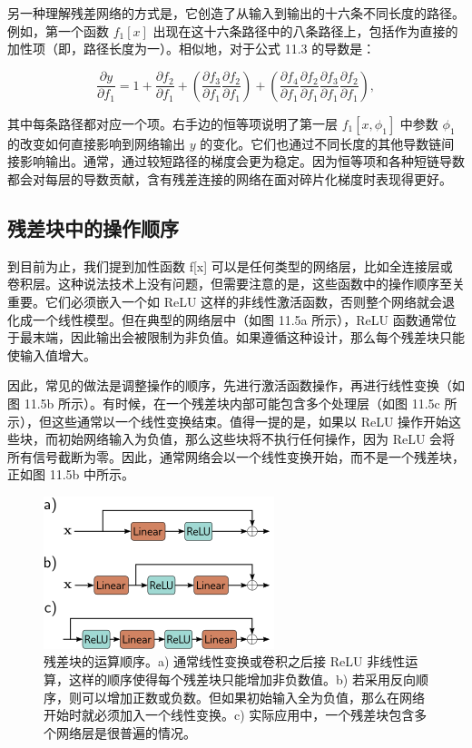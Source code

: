 另一种理解残差网络的方式是，它创造了从输入到输出的十六条不同长度的路径。例如，第一个函数 \(f_1[x]\) 出现在这十六条路径中的八条路径上，包括作为直接的加性项（即，路径长度为一）。相似地，对于公式 11.3 的导数是：

\begin{equation}
\frac{\partial y}{\partial f_1} = 1 + \frac{\partial f_2}{\partial f_1} + \left( \frac{\partial f_3}{\partial f_1} \frac{\partial f_2}{\partial f_1} \right) + \left( \frac{\partial f_4}{\partial f_1} \frac{\partial f_2}{\partial f_1} \frac{\partial f_3}{\partial f_1} \frac{\partial f_2}{\partial f_1} \right), 
\end{equation}

其中每条路径都对应一个项。右手边的恒等项说明了第一层 \(f_1[x, \phi_1]\) 中参数 \(\phi_1\) 的改变如何直接影响到网络输出 \(y\) 的变化。它们也通过不同长度的其他导数链间接影响输出。通常，通过较短路径的梯度会更为稳定。因为恒等项和各种短链导数都会对每层的导数贡献，含有残差连接的网络在面对碎片化梯度时表现得更好。

\subsection{残差块中的操作顺序}
到目前为止，我们提到加性函数 f[x] 可以是任何类型的网络层，比如全连接层或卷积层。这种说法技术上没有问题，但需要注意的是，这些函数中的操作顺序至关重要。它们必须嵌入一个如 ReLU 这样的非线性激活函数，否则整个网络就会退化成一个线性模型。但在典型的网络层中（如图 11.5a 所示），ReLU 函数通常位于最末端，因此输出会被限制为非负值。如果遵循这种设计，那么每个残差块只能使输入值增大。

因此，常见的做法是调整操作的顺序，先进行激活函数操作，再进行线性变换（如图 11.5b 所示）。有时候，在一个残差块内部可能包含多个处理层（如图 11.5c 所示），但这些通常以一个线性变换结束。值得一提的是，如果以 ReLU 操作开始这些块，而初始网络输入为负值，那么这些块将不执行任何操作，因为 ReLU 会将所有信号截断为零。因此，通常网络会以一个线性变换开始，而不是一个残差块，正如图 11.5b 中所示。

\begin{figure}[ht!]
\centering
\includegraphics[width=0.7\linewidth]{png/chapter11/ResidualOrder.png}
\caption{残差块的运算顺序。a) 通常线性变换或卷积之后接 ReLU 非线性运算，这样的顺序使得每个残差块只能增加非负数值。b) 若采用反向顺序，则可以增加正数或负数。但如果初始输入全为负值，那么在网络开始时就必须加入一个线性变换。c) 实际应用中，一个残差块包含多个网络层是很普遍的情况。}
\end{figure}


